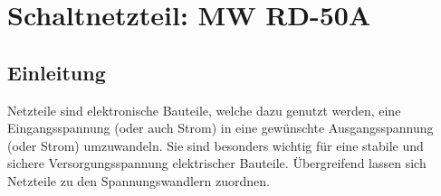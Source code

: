%
%
%


\chapter{Schaltnetzteil:  MW RD-50A}\label{Netzteil}
\section{Einleitung}
Netzteile sind elektronische Bauteile, welche dazu genutzt werden, eine Eingangsspannung (oder auch Strom) in eine gewünschte Ausgangsspannung (oder Strom) umzuwandeln. Sie sind besonders wichtig für eine stabile und sichere Versorgungsspannung elektrischer Bauteile. Übergreifend lassen sich Netzteile zu den Spannungswandlern zuordnen. \cite{Hering:2024}

